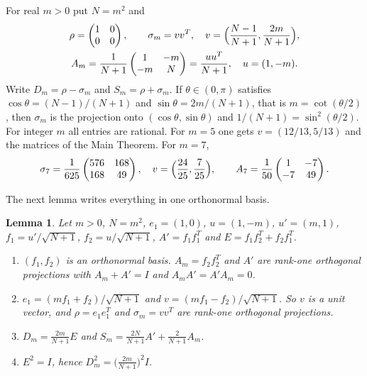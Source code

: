\documentclass[11pt]{amsart}
\newtheorem{lemma}[theorem]{Lemma}
\theoremstyle{definition}\newtheorem{definition}[theorem]{Definition}
\theoremstyle{remark}\newtheorem{remark}[theorem]{Remark}
\begin{document}
For real \(m>0\) put \(N=m^2\) and
\begin{gather*}
\rho=\begin{pmatrix}1&0\\0&0\end{pmatrix},\qquad
\sigma_m=vv^{T},\quad v=\Bigl(\frac{N-1}{N+1},\frac{2m}{N+1}\Bigr),\\
A_m=\frac{1}{N+1}\begin{pmatrix}1&-m\\-m&N\end{pmatrix}=\frac{uu^{T}}{N+1},\quad u=(1,-m).
\end{gather*}
Write \(D_m=\rho-\sigma_m\) and \(S_m=\rho+\sigma_m\). If \(\theta\in(0,\pi)\) satisfies \(\cos\theta=(N-1)/(N+1)\) and \(\sin\theta=2m/(N+1)\), that is \(m=\cot(\theta/2)\), then \(\sigma_m\) is the projection onto \((\cos\theta,\sin\theta)\) and \(1/(N+1)=\sin^2(\theta/2)\). For integer \(m\) all entries are rational. For \(m=5\) one gets \(v=(12/13,5/13)\) and the matrices of the Main Theorem. For \(m=7\),
\[
\sigma_7=\frac{1}{625}\begin{pmatrix}576&168\\168&49\end{pmatrix},\quad v=\Bigl(\frac{24}{25},\frac{7}{25}\Bigr),\qquad A_7=\frac{1}{50}\begin{pmatrix}1&-7\\-7&49\end{pmatrix}.
\]

The next lemma writes everything in one orthonormal basis.

\begin{lemma}\label{lem:family}
Let \(m>0\), \(N=m^2\), \(e_1=(1,0)\), \(u=(1,-m)\), \(u'=(m,1)\), \(f_1=u'/\sqrt{N+1}\), \(f_2=u/\sqrt{N+1}\), \(A'=f_1f_1^{T}\) and \(E=f_1f_2^{T}+f_2f_1^{T}\).
\begin{enumerate}
\item \((f_1,f_2)\) is an orthonormal basis. \(A_m=f_2f_2^{T}\) and \(A'\) are rank-one orthogonal projections with \(A_m+A'=I\) and \(A_mA'=A'A_m=0\).
\item \(e_1=(mf_1+f_2)/\sqrt{N+1}\) and \(v=(mf_1-f_2)/\sqrt{N+1}\). So \(v\) is a unit vector, and \(\rho=e_1e_1^{T}\) and \(\sigma_m=vv^{T}\) are rank-one orthogonal projections.
\item \(D_m=\frac{2m}{N+1}E\) and \(S_m=\frac{2N}{N+1}A'+\frac{2}{N+1}A_m\).
\item \(E^2=I\), hence \(D_m^2=\bigl(\frac{2m}{N+1}\bigr)^2I\).
\end{enumerate}
\end{lemma}
\end{document}
